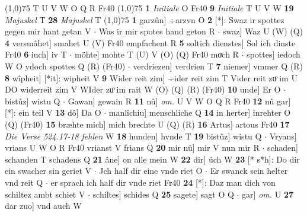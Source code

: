 \documentclass[8pt,a4paper,notitlepage]{article}
\begin{document}
\begin{table}[ht]
\begin{minipage}[t]{0.5\linewidth}
\begin{tabular}{rl}
\end{tabular}
\scriptsize
\line(1,0){75} \newline
T U V W O Q R Fr40 \newline
\line(1,0){75} \newline
\textbf{1} \textit{Initiale} O Fr40  \textbf{9} \textit{Initiale} T U V W  \textbf{19} \textit{Majuskel} T  \textbf{28} \textit{Majuskel} T  \newline
\line(1,0){75} \newline
\textbf{1} garzûn] ÷arzvn O \textbf{2} [*]: Swaz ir spottez gegen mir hant getan V  $\cdot$ Was ir mir spotes hand geton R  $\cdot$ swaz] Waz U (W) (Q) \textbf{4} versmâhet] smahet U (V) Fr40 empfachent R \textbf{5} soltich dienstes] Sol ich dinste Fr40 \textbf{6} iuch] iv T  $\cdot$ möhte] mohte T (U) V (O) (Q) Fr40 moͯch R  $\cdot$ spottes] iedoch W O ydoch spottes Q (R) (Fr40)  $\cdot$ verdriezen] verdrien T \textbf{7} niemer] vmmer Q (R) \textbf{8} wîpheit] [*it]: wipheit V \textbf{9} Wider reit zim] ÷ider reit zim T Vider reit zuͦ im U DO widerreit zim V WIder zuͦ im rait W (O) (Q) (R) (Fr40) \textbf{10} unde] Er O  $\cdot$ bistûz] wistu Q  $\cdot$ Gawan] gewain R \textbf{11} nû] \textit{om.} U V W O Q R Fr40 \textbf{12} nû gar] [*]: ein teil V \textbf{13} dô] Da O  $\cdot$ manlîchiu] menschliche Q \textbf{14} in herter] inrehter O (Q) (Fr40) \textbf{15} bræhte mich] mich brechte U (Q) (R) \textbf{16} Artus] artous Fr40 \textbf{17} \textit{Die Verse 524.17-18 fehlen} W  \textbf{18} hunden] hvnde T \textbf{19} bistûz] wistu Q  $\cdot$ Vryans] vrians U W O R Fr40 vrianst V frians Q \textbf{20} mir nû] mir V nun mir R  $\cdot$ schaden] schanden T schadens Q \textbf{21} âne] on alle mein W \textbf{22} dir] úch W \textbf{23} [* s*h]: Do dir ein swacher sin geriet V  $\cdot$ Jch half dir eine vnde riet O  $\cdot$ Er swanck sein helter vnd reit Q  $\cdot$ er sprach ich half dir vnde riet Fr40 \textbf{24} [*]: Daz man dich von schiltez ambt schiet V  $\cdot$ schiltes] schides Q \textbf{25} sagete] sagt O Q  $\cdot$ gar] \textit{om.} U \textbf{27} dar zuo] vnd auch W \newline
\end{minipage}
\end{table}
\end{document}
